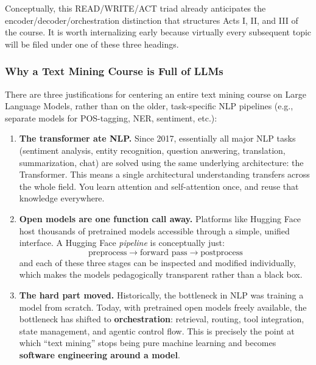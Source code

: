 Conceptually, this READ/WRITE/ACT triad already anticipates the encoder/decoder/orchestration distinction that structures Acts I, II, and III of the course. It is worth internalizing early because virtually every subsequent topic will be filed under one of these three headings.

\subsubsection{Why a Text Mining Course is Full of LLMs}

There are three justifications for centering an entire text mining course on Large Language Models, rather than on the older, task-specific NLP pipelines (e.g., separate models for POS-tagging, NER, sentiment, etc.):

\begin{enumerate}
    \item \textbf{The transformer ate NLP.} Since 2017, essentially all major NLP tasks (sentiment analysis, entity recognition, question answering, translation, summarization, chat) are solved using the same underlying architecture: the Transformer. This means a single architectural understanding transfers across the whole field. You learn attention and self-attention once, and reuse that knowledge everywhere.

    \vspace{0.2cm}
    \item \textbf{Open models are one function call away.} Platforms like Hugging Face host thousands of pretrained models accessible through a simple, unified interface. A Hugging Face \emph{pipeline} is conceptually just:
    $$\text{preprocess} \rightarrow \text{forward pass} \rightarrow \text{postprocess}$$
    and each of these three stages can be inspected and modified individually, which makes the models pedagogically transparent rather than a black box.

    \vspace{0.2cm}
    \item \textbf{The hard part moved.} Historically, the bottleneck in NLP was training a model from scratch. Today, with pretrained open models freely available, the bottleneck has shifted to \textbf{orchestration}: retrieval, routing, tool integration, state management, and agentic control flow. This is precisely the point at which ``text mining'' stops being pure machine learning and becomes \textbf{software engineering around a model}.
\end{enumerate}

